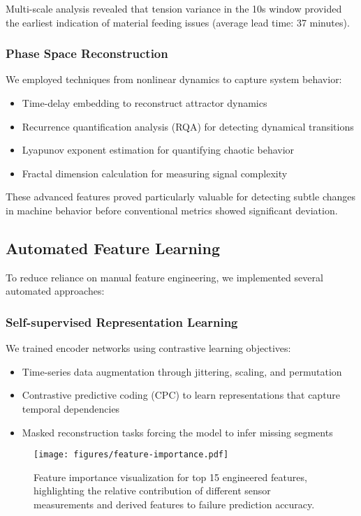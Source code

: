 Multi-scale analysis revealed that tension variance in the 10s window provided the earliest indication of material feeding issues (average lead time: 37 minutes).

\subsubsection{Phase Space Reconstruction}
We employed techniques from nonlinear dynamics to capture system behavior:
\begin{itemize}
    \item Time-delay embedding to reconstruct attractor dynamics
    \item Recurrence quantification analysis (RQA) for detecting dynamical transitions
    \item Lyapunov exponent estimation for quantifying chaotic behavior
    \item Fractal dimension calculation for measuring signal complexity
\end{itemize}

These advanced features proved particularly valuable for detecting subtle changes in machine behavior before conventional metrics showed significant deviation.

\subsection{Automated Feature Learning}
To reduce reliance on manual feature engineering, we implemented several automated approaches:

\subsubsection{Self-supervised Representation Learning}
We trained encoder networks using contrastive learning objectives:
\begin{itemize}
    \item Time-series data augmentation through jittering, scaling, and permutation
    \item Contrastive predictive coding (CPC) to learn representations that capture temporal dependencies
    \item Masked reconstruction tasks forcing the model to infer missing segments
\end{itemize}

\begin{figure}[t]
\centering
\texttt{[image: figures/feature-importance.pdf]}
\caption{Feature importance visualization for top 15 engineered features, highlighting the relative contribution of different sensor measurements and derived features to failure prediction accuracy.}
\label{fig:feature_importance}
\end{figure}

